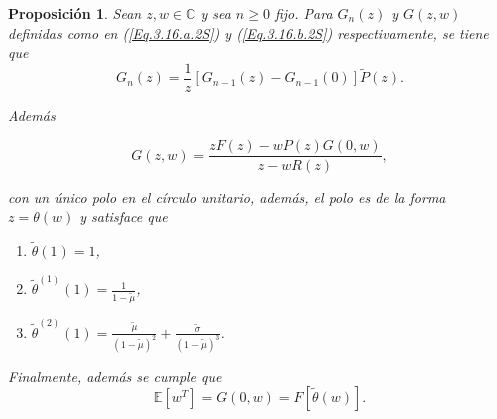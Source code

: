\documentclass{article}
\newtheorem{Prop}{Proposición}[section]
\newcommand{\esp}{\mathbb{E}}
\numberwithin{equation}{section}
\begin{document}
\begin{Prop}\label{Prop.1.1.2S}
Sean $z,w\in\mathbb{C}$ y sea $n\geq0$ fijo. Para $G_{n}\left(z\right)$ y $G\left(z,w\right)$ definidas como en (\ref{Eq.3.16.a.2S}) y (\ref{Eq.3.16.b.2S}) respectivamente, se tiene que
\begin{equation}\label{Eq.Pag.45}
G_{n}\left(z\right)=\frac{1}{z}\left[G_{n-1}\left(z\right)-G_{n-1}\left(0\right)\right]\tilde{P}\left(z\right).
\end{equation}

Adem\'as

\begin{equation}\label{Eq.Pag.46}
G\left(z,w\right)=\frac{zF\left(z\right)-wP\left(z\right)G\left(0,w\right)}{z-wR\left(z\right)},
\end{equation}

con un \'unico polo en el c\'irculo unitario, adem\'as, el polo es
de la forma $z=\theta\left(w\right)$ y satisface que

\begin{enumerate}
\item[i)]$\tilde{\theta}\left(1\right)=1$,

\item[ii)] $\tilde{\theta}^{(1)}\left(1\right)=\frac{1}{1-\tilde{\mu}}$,

\item[iii)]
$\tilde{\theta}^{(2)}\left(1\right)=\frac{\tilde{\mu}}{\left(1-\tilde{\mu}\right)^{2}}+\frac{\tilde{\sigma}}{\left(1-\tilde{\mu}\right)^{3}}$.
\end{enumerate}

Finalmente, adem\'as se cumple que
\begin{equation}
\esp\left[w^{T}\right]=G\left(0,w\right)=F\left[\tilde{\theta}\left(w\right)\right].
\end{equation}
\end{Prop}
\end{document}
